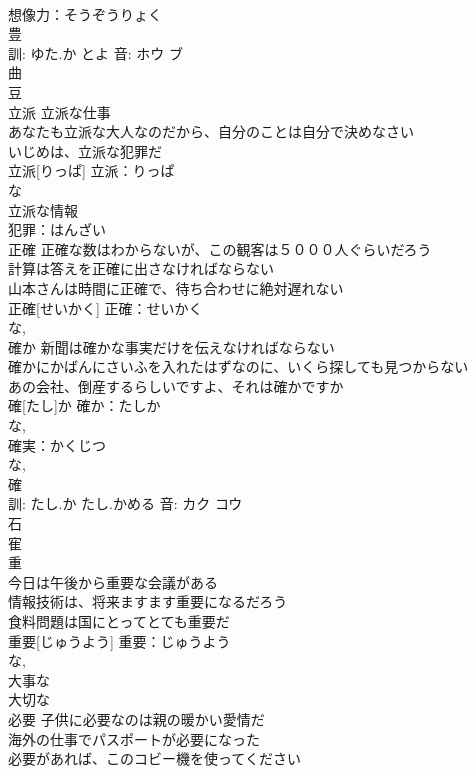 \documentclass[8pt]{extreport}
\begin{document}
\begin{CJK}{UTF8}{min}
\\	想像力：そうぞうりょく
\\	豊 
\\	訓: ゆた.か とよ 音: ホウ ブ 
\\	曲 
\\	豆 
\\	立派	立派な仕事 
\\	あなたも立派な大人なのだから、自分のことは自分で決めなさい 
\\	いじめは、立派な犯罪だ 
\\	立派[りっぱ]			立派：りっぱ
\\	な 
\\	立派な情報 
\\	犯罪：はんざい
\\	正確	正確な数はわからないが、この観客は５０００人ぐらいだろう 
\\	計算は答えを正確に出さなければならない 
\\	山本さんは時間に正確で、待ち合わせに絶対遅れない 
\\	正確[せいかく]				正確：せいかく
\\	な, 
\\	確か	新聞は確かな事実だけを伝えなければならない 
\\	確かにかばんにさいふを入れたはずなのに、いくら探しても見つからない 
\\	あの会社、倒産するらしいですよ、それは確かですか 
\\	確[たし]か			確か：たしか
\\	な, 
\\	確実：かくじつ
\\	な, 
\\	確 
\\	訓: たし.か たし.かめる 音: カク コウ 
\\	石 
\\	寉 
\\	重
\\	今日は午後から重要な会議がある 
\\	情報技術は、将来ますます重要になるだろう 
\\	食料問題は国にとってとても重要だ 
\\	重要[じゅうよう]			重要：じゅうよう
\\	な, 
\\	大事な 
\\	大切な 
\\	必要	子供に必要なのは親の暖かい愛情だ 
\\	海外の仕事でパスポートが必要になった 
\\	必要があれば、このコビー機を使ってください 

\end{CJK}
\end{document}
